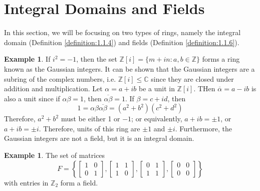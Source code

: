 \documentclass[11pt]{book}
\theoremstyle{definition}\newtheorem{definition}[subsection]{Definition}
\theoremstyle{definition}\newtheorem{example}[subsection]{Example}
\theoremstyle{definition}\newtheorem{notation}[subsection]{Notation}
\theoremstyle{definition}\newtheorem{remark}[subsection]{Remark}
\theoremstyle{theorem}\newtheorem{theorem}[subsection]{Theorem}
\theoremstyle{theorem}\newtheorem{lemma}[subsection]{Lemma}
\theoremstyle{theorem}\newtheorem{proposition}[subsection]{Proposition}
\theoremstyle{theorem}\newtheorem{corollary}[subsection]{Corollary}
\newcommand{\C}{\mathbb{C}}
\newcommand{\Z}{\mathbb{Z}}
\begin{document}
\section{Integral Domains and Fields}

In this section, we will be focusing on two types of rings, namely the integral domain (Definition \ref{definition:1.1.4}) and fields (Definition \ref{definition:1.1.6}).  

\begin{example}\label{example:1.2.1}
    If $i^2 = -1$, then the set $\Z[i] = \{m + in : a, b \in \Z\}$ forms a ring known as the Gaussian integers. It can be shown that the Gaussian integers are a subring of the complex numbers, i.e. $\Z[i] \leq \C$ since they are closed under addition and multiplication. Let $\alpha = a + ib$ be a unit in $\Z[i]$. THen $\overline{\alpha} = a - ib$ is also a unit since if $\alpha\beta = 1$, then $\overline{\alpha\beta} = 1$. If $\beta = c + id$, then
    \begin{equation*}
        1 = \alpha\beta\overline{\alpha\beta} = (a^2 + b^2)(c^2 + d^2)
    \end{equation*}
    Therefore, $a^2 + b^2$ must be either 1 or $-1$; or equivalently, $a + ib = \pm 1$, or $a + ib = \pm i$. Therefore, units of this ring are $\pm 1$ and $\pm i$. Furthermore, the Gaussian integers are not a field, but it is an integral domain.
\end{example}

\begin{example}\label{example:1.2.2}
    The set of matrices
    \begin{equation*}
        F = \left\{\begin{bmatrix} 1 & 0 \\ 0 & 1 \end{bmatrix}, \begin{bmatrix} 1 & 1 \\ 1 & 0 \end{bmatrix}, \begin{bmatrix} 0 & 1 \\ 1 & 1 \end{bmatrix}, \begin{bmatrix} 0 & 0 \\ 0 & 0 \end{bmatrix}\right\}
    \end{equation*}
    with entries in $\Z_2$ form a field.
\end{example}
\end{document}

